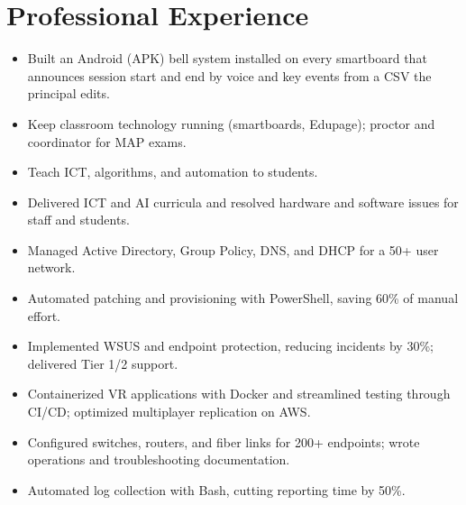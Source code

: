 \documentclass[a4paper,10pt]{article}
\begin{document}
\section*{Professional Experience}
\begin{itemize}
  \item Built an Android (APK) bell system installed on every smartboard that announces session start and end by voice and key events from a CSV the principal edits.
  \item Keep classroom technology running (smartboards, Edupage); proctor and coordinator for MAP exams.
  \item Teach ICT, algorithms, and automation to students.
\end{itemize}
\begin{itemize}
  \item Delivered ICT and AI curricula and resolved hardware and software issues for staff and students.
\end{itemize}
\begin{itemize}
  \item Managed Active Directory, Group Policy, DNS, and DHCP for a 50+ user network.
  \item Automated patching and provisioning with PowerShell, saving 60\% of manual effort.
  \item Implemented WSUS and endpoint protection, reducing incidents by 30\%; delivered Tier 1/2 support.
\end{itemize}
\begin{itemize}
  \item Containerized VR applications with Docker and streamlined testing through CI/CD; optimized multiplayer replication on AWS.
\end{itemize}
\begin{itemize}
  \item Configured switches, routers, and fiber links for 200+ endpoints; wrote operations and troubleshooting documentation.
  \item Automated log collection with Bash, cutting reporting time by 50\%.
\end{itemize}
\end{document}
